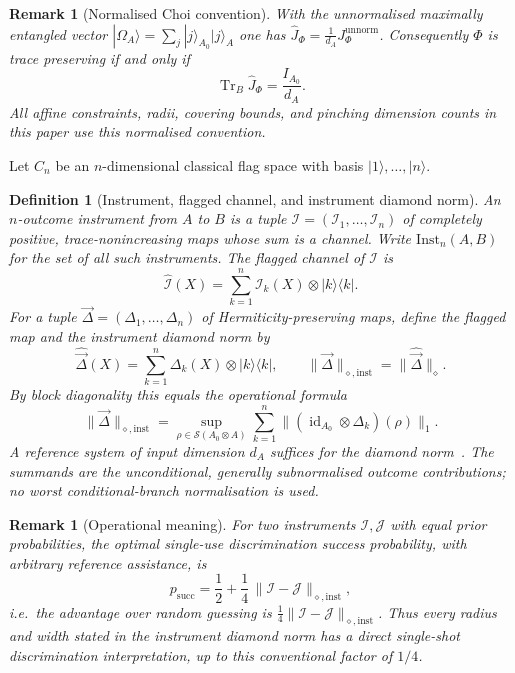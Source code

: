 \documentclass[11pt,a4paper]{article}
\newtheorem{definition}[theorem]{Definition}
\newtheorem{remark}[theorem]{Remark}
\newcommand{\Sstate}{\mathcal{S}}
\newcommand{\Inst}{\mathrm{Inst}}
\newcommand{\Tr}{\operatorname{Tr}}
\newcommand{\id}{\operatorname{id}}
\newcommand{\Jhat}{\widehat J}
\newcommand{\vD}{\vec{\Delta}}
\begin{document}
\begin{remark}[Normalised Choi convention]
\label{rem:choi-convention}
With the unnormalised maximally entangled vector $|\Omega_A\rangle=\sum_j|j\rangle_{A_0}|j\rangle_A$ one has $\Jhat_\Phi=\tfrac1{d_A}J_\Phi^{\mathrm{unnorm}}$. Consequently $\Phi$ is trace preserving if and only if
\[
\Tr_B\Jhat_\Phi=\frac{I_{A_0}}{d_A}.
\]
All affine constraints, radii, covering bounds, and pinching dimension counts in this paper use this normalised convention.
\end{remark}

Let $C_n$ be an $n$-dimensional classical flag space with basis $|1\rangle,\dots,|n\rangle$.

\begin{definition}[Instrument, flagged channel, and instrument diamond norm]
An $n$-outcome instrument from $A$ to $B$ is a tuple $\mathcal I=(\mathcal I_1,\dots,\mathcal I_n)$ of completely positive, trace-nonincreasing maps whose sum is a channel. Write $\Inst_n(A,B)$ for the set of all such instruments. The flagged channel of $\mathcal I$ is
\[
\widehat{\mathcal I}(X)=\sum_{k=1}^n\mathcal I_k(X)\otimes|k\rangle\langle k|.
\]
For a tuple $\vD=(\Delta_1,\dots,\Delta_n)$ of Hermiticity-preserving maps, define the flagged map and the instrument diamond norm by
\[
\widehat{\vD}(X)=\sum_{k=1}^n\Delta_k(X)\otimes|k\rangle\langle k|,
\qquad
\|\vD\|_{\diamond,\mathrm{inst}}=\|\widehat{\vD}\|_\diamond.
\]
By block diagonality this equals the operational formula
\[
\|\vD\|_{\diamond,\mathrm{inst}}
=\sup_{\rho\in\Sstate(A_0\otimes A)}
\sum_{k=1}^n\|(\id_{A_0}\otimes\Delta_k)(\rho)\|_1.
\]
A reference system of input dimension $d_A$ suffices for the diamond norm~\cite{Watrous2018}. The summands are the unconditional, generally subnormalised outcome contributions; no worst conditional-branch normalisation is used.
\end{definition}

\begin{remark}[Operational meaning]
\label{rem:operational}
For two instruments $\mathcal I,\mathcal J$ with equal prior probabilities, the optimal single-use discrimination success probability, with arbitrary reference assistance, is
\[
p_{\mathrm{succ}}
=\frac12+\frac14\,\|\mathcal I-\mathcal J\|_{\diamond,\mathrm{inst}},
\]
i.e.\ the advantage over random guessing is $\tfrac14\|\mathcal I-\mathcal J\|_{\diamond,\mathrm{inst}}$. Thus every radius and width stated in the instrument diamond norm has a direct single-shot discrimination interpretation, up to this conventional factor of $1/4$.
\end{remark}
\end{document}
